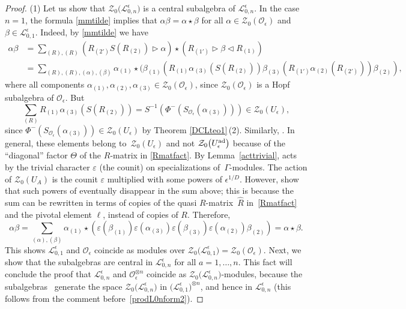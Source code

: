 \documentclass[10pt,a4paper]{amsart}
\numberwithin{equation}{section}
\theoremstyle{definition}
\newcommand{\e}{\epsilon}
\newcommand{\Ll}{{\mathcal L}}
\newcommand{\Oo}{{\mathcal O}}
\begin{document}
\begin{proof} (1) Let us show that $\mathcal{Z}_0\bigl(\Ll_{0,n}^\e\bigr)$ is a central subalgebra of $\Ll_{0,n}^\e$. In the case $n=1$, the formula \eqref{mmtilde} implies that $\alpha \beta = \alpha\star \beta$ for all $\alpha\in \mathcal{Z}_0(\Oo_\e)$ and $\beta\in \Ll_{0,1}^\e$. Indeed, by \eqref{mmtilde} we have %
\begin{align*}
\alpha\beta & = \sum_{(R),(R)}(R_{(2')}{S}(R_{(2)}) \rhd \alpha) \star (R_{(1')}\rhd \beta \lhd R_{(1)})\\
& = \sum_{(R),(R),(\alpha), (\beta)} \alpha_{(1)} \star ( \beta_{(1)}(R_{(1)}\alpha_{(3)}(S(R_{(2)}))\beta_{(3)}(R_{(1')}\alpha_{(2)}(R_{(2')}))\beta_{(2)}),
\end{align*}
where all components $\alpha_{(1)}, \alpha_{(2)}, \alpha_{(3)}\in \mathcal{Z}_0(\Oo_\e)$, since $\mathcal{Z}_0(\Oo_\e)$ is a Hopf subalgebra of $\Oo_\e$. But
\[
 \sum_{(R)} R_{(1)}\alpha_{(3)}(S(R_{(2)})) = S^{-1}(\Phi^{-}(S_{\Oo_\e}(\alpha_{(3)})))\in \mathcal{Z}_0(U_\epsilon),
\]
 since $\Phi^-(S_{\Oo_\e}(\alpha_{(3)})) \in \mathcal{Z}_0(U_\epsilon)$ by Theorem \ref{DCLteo1}\,(2). Similarly, . In general, these elements belong to~$\mathcal{Z}_0(U_\epsilon)$ and not ${\mathcal Z}_0\big(U_\epsilon^{\rm ad}\big)$ because of the ``diagonal'' factor $\Theta$ of the $R$-matrix in \eqref{Rmatfact}. By Lemma~\ref{acttrivial},  acts by the trivial character $\varepsilon$ (the counit) on specializations of~$\Gamma$-modules. The action of ${\mathcal Z}_0(U_A)$ is the counit $\varepsilon$ multiplied with some powers of $\epsilon^{1/D}$.
However, \cite[Propositions 4.1 and 4.10]{BR} show that such powers of  eventually disappear in the sum above; this is because the sum can be rewritten in terms of copies of the quasi $R$-matrix~$\hat{R}$ in~\eqref{Rmatfact} and the pivotal element $\ell$, instead of copies of $R$. Therefore, \begin{equation}\label{produitZ0eps}
\alpha\beta = \sum_{(\alpha), (\beta)} \alpha_{(1)} \star ( \varepsilon(\beta_{(1)})\varepsilon(\alpha_{(3)})\varepsilon(\beta_{(3)})\varepsilon(\alpha_{(2)})\beta_{(2)}) = \alpha \star \beta.
\end{equation}
This shows $\Ll_{0,1}^\e$ and $\Oo_\e$ coincide as modules over
$\mathcal{Z}_0\bigl(\Ll_{0,1}^\e\bigr)= \mathcal{Z}_0(\Oo_\e)$.
 Next, we show that the subalgebras \smash{$\mathcal{Z}_0(\Oo_\e)^{(a)}$} are central in $\Ll_{0,n}^\e$ for all $a=1,\dots,n$. This fact will conclude the proof that $\Ll_{0,n}^\e$ and $\Oo_\e^{\otimes n}$ coincide as $\mathcal{Z}_0\bigl(\Ll_{0,n}^\e\bigr)$-modules, because the subalgebras~\smash{$\mathcal{Z}_0(\Oo_\e)^{(a)}$} generate the space $\mathcal{Z}_0\bigl(\Ll_{0,n}^\e\bigr)$ in $\bigl(\Ll_{0,1}^\e\bigr)^{\otimes n}$, and hence in $\Ll_{0,n}^\e$ (this follows from the comment before~\eqref{prodL0nform2}).


\end{proof}
\end{document}

